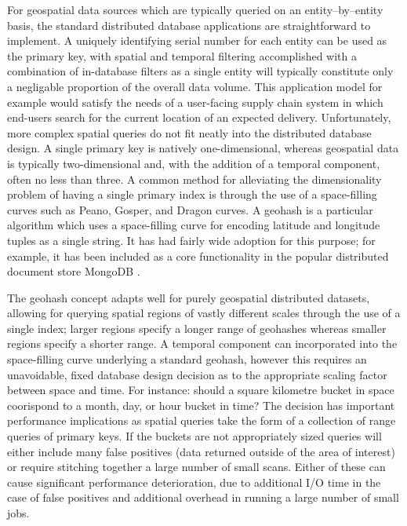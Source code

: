 \documentclass[nips13submit_09,times,art10]{article} %
\begin{document}
For geospatial data sources which are typically queried on an entity--by--entity basis, the
standard distributed database applications are straightforward to implement. A uniquely
identifying serial number for each entity can be used as the primary key, with spatial
and temporal filtering accomplished with a combination of in-database filters as a single
entity will typically constitute only a negligable proportion of the overall data volume.
This application model for example would satisfy the needs of a user-facing supply chain
system in which end-users search for the current location of an expected delivery.
Unfortunately, more complex spatial queries do not fit neatly into the distributed database
design. A single primary key is natively one-dimensional, whereas geospatial data
is typically two-dimensional and, with the addition of a temporal component, often
no less than three. A common method for alleviating the dimensionality problem of having a single primary
index is through the use of a space-filling curves such as Peano, Gosper, and Dragon
curves. A geohash is a particular algorithm which uses a space-filling curve for
encoding latitude and longitude tuples as a single string. It has had fairly wide adoption
for this purpose; for example, it has been included as a core functionality in the popular
distributed document store MongoDB \cite{chodorow2013mongodb}.

The geohash concept adapts well for purely geospatial distributed datasets, allowing for
querying spatial regions of vastly different scales through the use of a single index; larger
regions specify a longer range of geohashes whereas smaller regions specify a shorter range.
A temporal component can incorporated into the space-filling curve underlying a standard
geohash, however this requires an unavoidable, fixed database design decision as to the
appropriate scaling factor between space and time. For instance: should a square kilometre
bucket in space coorispond to a month, day, or hour bucket in time? The decision has
important performance implications as spatial queries take the form of a collection of
range queries of primary keys. If the buckets are not appropriately sized queries will either
include many false positives (data returned outside of the area of interest) or require
stitching together a large number of small scans. Either of these can cause significant
performance deterioration, due to additional I/O time in the case of false positives and
additional overhead in running a large number of small jobs.
\end{document}
